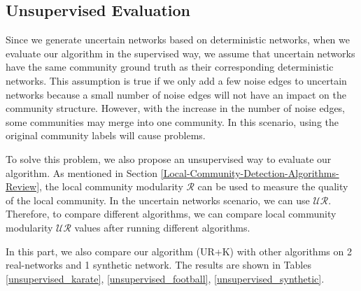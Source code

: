 \documentclass[\main/thesis.tex]{subfiles}
\begin{document}

\subsection*{Unsupervised Evaluation}
Since we generate uncertain networks based on deterministic networks, when we evaluate our algorithm in the supervised way, we assume that uncertain networks have the same community ground truth as their corresponding deterministic networks. This assumption is true if we only add a few noise edges to uncertain networks because a small number of noise edges will not have an impact on the community structure. However, with the increase in the number of noise edges, some communities may merge into one community. In this scenario, using the original community labels will cause problems.

To solve this problem, we also propose an unsupervised way to evaluate our algorithm. As mentioned in Section \ref{Local-Community-Detection-Algorithms-Review}, the local community modularity $\mathcal{R}$ can be used to measure the quality of the local community. In the uncertain networks scenario, we can use $\mathcal{UR}$. Therefore, to compare different algorithms, we can compare local community modularity $\mathcal{UR}$ values after running different algorithms.

In this part, we also compare our algorithm (UR+K) with other algorithms on 2 real-networks and 1 synthetic network. The results are shown in Tables \ref{unsupervised_karate}, \ref{unsupervised_football}, \ref{unsupervised_synthetic}.
\end{document}
